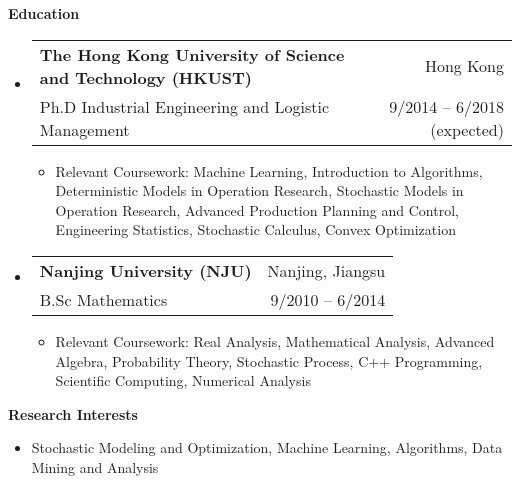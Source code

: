 \documentclass[letterpaper,10pt]{article}
\makeatletter
\newcommand{\resitem}[1]{\item #1 \vspace{-2pt}}
\newcommand{\resheading}[1]{{\large \colorbox{mygrey}{\begin{minipage}{\textwidth}{\textbf{#1 \vphantom{p\^{E}}}}\end{minipage}}}}
\newcommand{\ressubheading}[4]{
\begin{tabular*}{6.5in}{l@{\extracolsep{\fill}}r}
    \textbf{#1} & #2 \\
    #3 & #4 \\
\end{tabular*}\vspace{-6pt}}
\makeatother
\begin{document}
\resheading{Education}
\begin{itemize}
\item \ressubheading{The Hong Kong University of Science and Technology (HKUST)}{Hong Kong}{Ph.D Industrial Engineering and Logistic Management}{9/2014 -- 6/2018 (expected)}

\begin{itemize}
\resitem{Relevant Coursework: Machine Learning, Introduction to Algorithms, Deterministic Models in Operation Research, Stochastic Models in Operation Research, Advanced Production Planning and Control, Engineering Statistics, Stochastic Calculus, Convex Optimization}
\end{itemize}

\item \ressubheading{Nanjing University (NJU)}{Nanjing, Jiangsu}{B.Sc Mathematics}{9/2010 -- 6/2014}

\begin{itemize}
\resitem{Relevant Coursework: Real Analysis, Mathematical Analysis, Advanced Algebra, Probability Theory, Stochastic Process, C++ Programming, Scientific Computing, Numerical Analysis}
\end{itemize}

\end{itemize}


\resheading{Research Interests}
\begin{itemize}
\item Stochastic Modeling and Optimization, Machine Learning, Algorithms, Data Mining and Analysis
\end{itemize}
\end{document}
